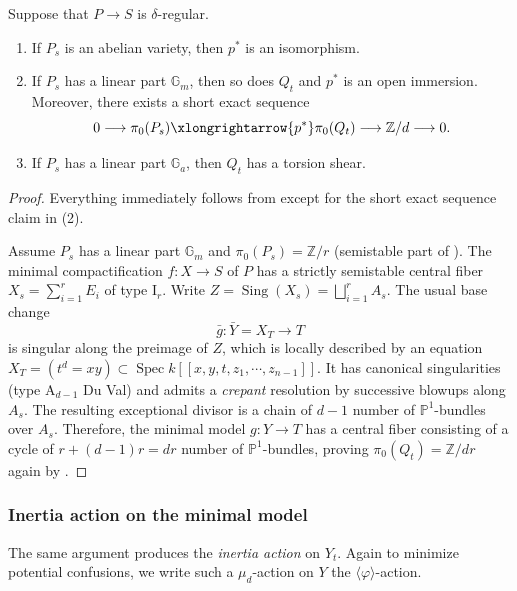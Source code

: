 \documentclass[reqno, letterpaper]{amsart}
\numberwithin{equation}{subsection}
\let\to\longrightarrow
\newcommand{\GG}{\mathbb{G}}
\newcommand{\PP}{\mathbb{P}}
\newcommand{\ZZ}{\mathbb{Z}}
\DeclareMathOperator{\Spec}{Spec}
\DeclareMathOperator{\Sing}{Sing}
\begin{document}
			\begin{corollary} \label{cor:Edixhoven}
				Suppose that $P \to S$ is $\delta$-regular.
				\begin{enumerate}
					\item If $P_s$ is an abelian variety, then $p^*$ is an isomorphism.
					\item If $P_s$ has a linear part $\GG_m$, then so does $Q_t$ and $p^*$ is an open immersion. Moreover, there exists a short exact sequence
					\[ 0 \to \pi_0 (P_s) \xlongrightarrow{p^*} \pi_0(Q_t) \to \ZZ/d \to 0 .\]
					\item If $P_s$ has a linear part $\GG_a$, then $Q_t$ has a torsion shear.
				\end{enumerate}
			\end{corollary}
			\begin{proof}
				Everything immediately follows from  except for the short exact sequence claim in (2).
				
				\medskip
				
				Assume $P_s$ has a linear part $\GG_m$ and $\pi_0(P_s) = \ZZ/r$ (semistable part of ). The minimal compactification $f : X \to S$ of $P$ has a strictly semistable central fiber $X_s = \sum_{i=1}^r E_i$ of type $\mathrm I_r$. Write $Z = \Sing(X_s) = \bigsqcup_{i=1}^r A_s$. The usual base change
				\[ \bar g : \bar Y = X_T \to T \]
				is singular along the preimage of $Z$, which is locally described by an equation $X_T = (t^d = xy) \subset \Spec k[[x,y, t, z_1, \cdots, z_{n-1}]]$. It has canonical singularities (type $\mathrm A_{d-1}$ Du Val) and admits a \emph{crepant} resolution by successive blowups along $A_s$. The resulting exceptional divisor is a chain of $d-1$ number of $\PP^1$-bundles over $A_s$. Therefore, the minimal model $g : Y \to T$ has a central fiber consisting of a cycle of $r + (d-1)r = dr$ number of $\PP^1$-bundles, proving $\pi_0 (Q_t) = \ZZ/dr$ again by .
			\end{proof}
			
			
			
		\subsubsection{Inertia action on the minimal model}
			The same argument produces the \emph{inertia action} on $Y_t$. Again to minimize potential confusions, we write such a $\mu_d$-action on $Y$ the $\langle \varphi \rangle$-action.
			
\end{document}
